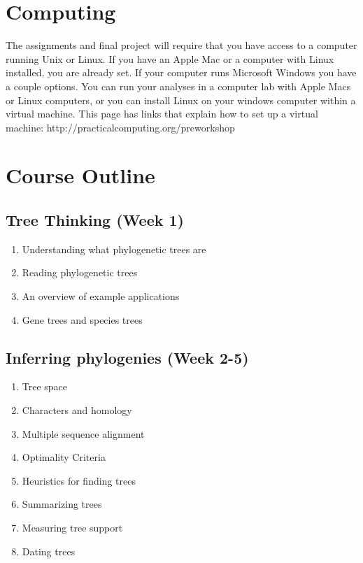 \documentclass[12pt]{article}
\begin{document}
\section*{Computing}
The assignments and final project will require that you have access to a computer running Unix or Linux. If you have an Apple Mac or a computer with Linux installed, you are already set. If your computer runs Microsoft Windows you have a couple options. You can run your analyses in a computer lab with Apple Macs or Linux computers, or you can install Linux on your windows computer within a virtual machine. This page has links that explain how to set up a virtual machine: http://practicalcomputing.org/preworkshop

\section*{Course Outline}

\subsection*{Tree Thinking \textnormal{\small{(Week 1)}}}

\begin{enumerate}
\item Understanding what phylogenetic trees are
\item Reading phylogenetic trees
\item An overview of example applications
\item Gene trees and species trees

\end{enumerate}


\subsection*{Inferring phylogenies \textnormal{\small{(Week 2-5)}}}

\begin{enumerate}
\item Tree space
\item Characters and homology
\item Multiple sequence alignment
\item Optimality Criteria
\item Heuristics for finding trees
\item Summarizing trees
\item Measuring tree support
\item Dating trees
\end{enumerate}
\end{document}
